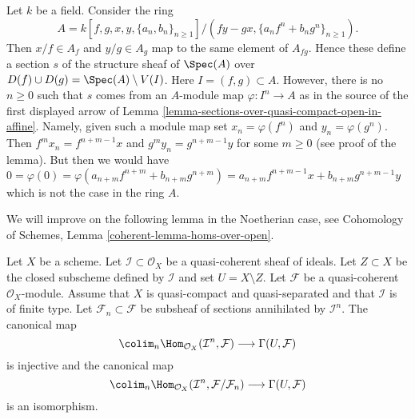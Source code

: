 \begin{example}
\label{example-does-not-work-in-general}
Let $k$ be a field. Consider the ring
$$
A = k[f, g, x, y, \{a_n, b_n\}_{n \geq1}]/
(fy - gx, \{a_nf^n + b_ng^n\}_{n \geq 1}).
$$
Then $x/f \in A_f$ and $y/g \in A_g$ map to the same element of
$A_{fg}$. Hence these define a section $s$ of the structure sheaf
of $\Spec(A)$ over $D(f) \cup D(g) = \Spec(A) \setminus V(I)$.
Here $I = (f, g) \subset A$. However, there is no
$n \geq 0$ such that $s$ comes from an $A$-module map
$\varphi : I^n \to A$ as in the source of the first displayed arrow
of Lemma \ref{lemma-sections-over-quasi-compact-open-in-affine}.
Namely, given such a module map set
$x_n = \varphi(f^n)$ and $y_n = \varphi(g^n)$.
Then $f^mx_n = f^{n + m - 1}x$ and
$g^my_n = g^{n + m - 1}y$ for some $m \geq 0$ (see proof
of the lemma). But then we would have
$0 = \varphi(0) =
\varphi(a_{n + m}f^{n + m} + b_{n + m}g^{n + m}) =
a_{n + m}f^{n + m - 1}x + b_{n + m}g^{n + m - 1}y$ which is not the case
in the ring $A$.
\end{example}

\noindent
We will improve on the following lemma in the Noetherian case, see
Cohomology of Schemes, Lemma \ref{coherent-lemma-homs-over-open}.

\begin{lemma}
\label{lemma-sections-over-quasi-compact-open}
Let $X$ be a scheme.
Let $\mathcal{I} \subset \mathcal{O}_X$ be a quasi-coherent sheaf
of ideals. Let $Z \subset X$ be the closed subscheme
defined by $\mathcal{I}$ and set $U = X \setminus Z$.
Let $\mathcal{F}$ be a quasi-coherent $\mathcal{O}_X$-module.
Assume that $X$ is quasi-compact and quasi-separated and
that $\mathcal{I}$ is of finite type.
Let $\mathcal{F}_n \subset \mathcal{F}$
be subsheaf of sections annihilated by $\mathcal{I}^n$.
The canonical map
$$
\colim_n \Hom_{\mathcal{O}_X}(\mathcal{I}^n,
\mathcal{F})
\longrightarrow
\Gamma(U, \mathcal{F})
$$
is injective and the canonical map
$$
\colim_n \Hom_{\mathcal{O}_X}(\mathcal{I}^n,
\mathcal{F}/\mathcal{F}_n)
\longrightarrow
\Gamma(U, \mathcal{F})
$$
is an isomorphism.
\end{lemma}

